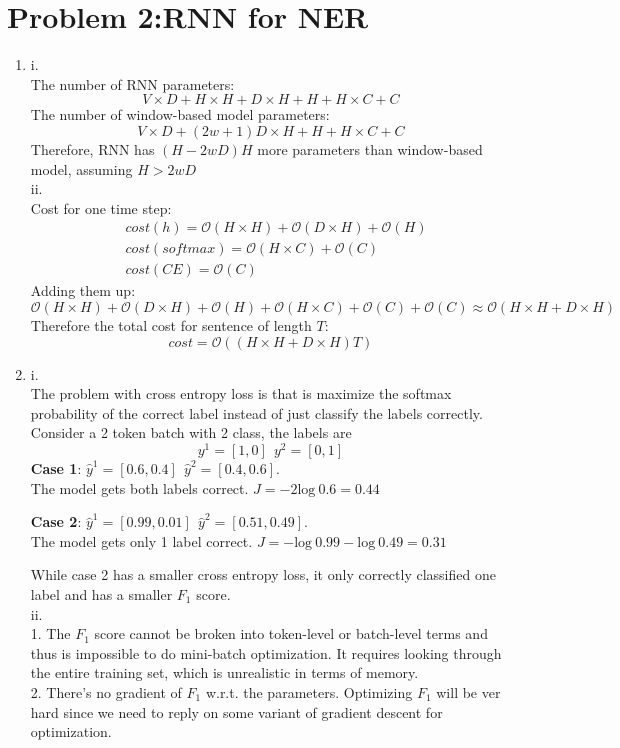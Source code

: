 \documentclass[10pt]{article}
\begin{document}
\section*{Problem 2:RNN for NER}
\begin{enumerate}[label=(\alph*)]
\item
i.\\
The number of RNN parameters:
$$
V \times D + H \times H + D \times H + H + H \times C + C
$$
The number of window-based model parameters:
$$
V \times D + (2w+1)D \times H + H + H \times C + C
$$
Therefore, RNN has $(H - 2wD)H$ more parameters than window-based model, assuming $H > 2wD$\\

ii.\\
Cost for one time step:
$$
\begin{aligned}
& cost(h) = \mathcal{O}(H \times H) + \mathcal{O}(D \times H) + \mathcal{O}(H)\\
& cost(softmax) = \mathcal{O}(H \times C) + \mathcal{O}(C)\\
& cost(CE) = \mathcal{O}(C)
\end{aligned}
$$
Adding them up:
$$
\mathcal{O}(H \times H) + \mathcal{O}(D \times H) + \mathcal{O}(H) + \mathcal{O}(H \times C) + \mathcal{O}(C) + \mathcal{O}(C) \approx \mathcal{O}(H \times H + D \times H)
$$
Therefore the total cost for sentence of length $T$:
$$
cost =  \mathcal{O}((H \times H + D \times H)T)
$$

\item
i.\\
The problem with cross entropy loss is that is maximize the softmax probability of the correct label instead of just classify the labels correctly. Consider a 2 token batch with 2 class, the labels are
$$y^{1} = [1, 0] \ \  y^{2} = [0, 1]$$
\textbf{Case 1}: $\hat{y}^{1} = [0.6, 0.4] \ \ \hat{y}^{2} = [0.4, 0.6]$. \\
The model gets both labels correct. $J = -2\text{log} \ 0.6 = 0.44$\par
\textbf{Case 2}: $\hat{y}^{1} = [0.99, 0.01] \ \ \hat{y}^{2} = [0.51, 0.49]$.\\
The model gets only 1 label correct. $J = -\text{log} \ 0.99 -\text{log} \ 0.49 = 0.31$\par
While case 2 has a smaller cross entropy loss, it only correctly classified one label and has a smaller $F_1$ score.\\

ii.\\
1. The $F_1$ score cannot be broken into token-level or batch-level terms and thus is impossible to do mini-batch optimization.
It requires looking through the entire training set, which is unrealistic in terms of memory. \\
2. There's no gradient of $F_1$ w.r.t. the parameters.
Optimizing $F_1$ will be ver hard since we need to reply on some variant of gradient descent for optimization.\\


\end{enumerate}
\end{document}

